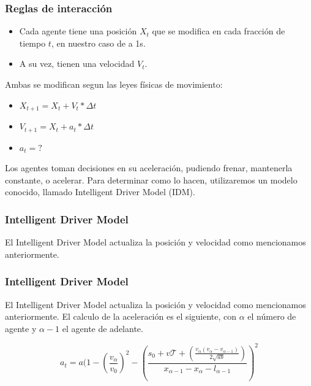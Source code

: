 \documentclass[10pt, compress]{beamer}
\begin{document}
\begin{frame}[fragile]

\frametitle{Reglas de interacci\'on}
\begin{itemize}
\item Cada agente tiene una posici\'on $X_t$ que se modifica en cada fracci\'on de tiempo $t$, en nuestro caso de a 1s.
\item A su vez, tienen una velocidad $V_t$.
\end{itemize}
Ambas se modifican segun las leyes f\'isicas de movimiento:
\begin{itemize}
\item $X_{t+1} = X_t + V_t * \Delta t$
\item $V_{t+1} = X_t + a_t * \Delta t$
\item $a_t = ?$ 
\end{itemize}

Los agentes toman decisiones en su aceleraci\'on, pudiendo frenar, mantenerla constante, o acelerar. Para determinar como lo hacen, utilizaremos un modelo conocido, llamado Intelligent Driver Model (IDM). \supercite{1}

\end{frame}

\begin{frame}[fragile]

\frametitle{Intelligent Driver Model}
El Intelligent Driver Model actualiza la posici\'on y velocidad como mencionamos anteriormente.

\end{frame}
\begin{frame}[fragile]

\frametitle{Intelligent Driver Model}
El Intelligent Driver Model actualiza la posici\'on y velocidad como mencionamos anteriormente. El calculo de la aceleraci\'on es el siguiente, con $\alpha$ el n\'umero de agente y $\alpha - 1$ el agente de adelante.

  \begin{equation*}
    a_t = a (1 - (\frac{v_\alpha}{v_0})^2 - (\frac{s_0 + v\mathcal{T} + (\frac{v_\alpha (v_\alpha - v_{\alpha-1})}{2\sqrt{ab}})}{x_{\alpha-1} - x_\alpha - l_{\alpha-1}})^2
  \end{equation*}

\end{frame}
\end{document}
